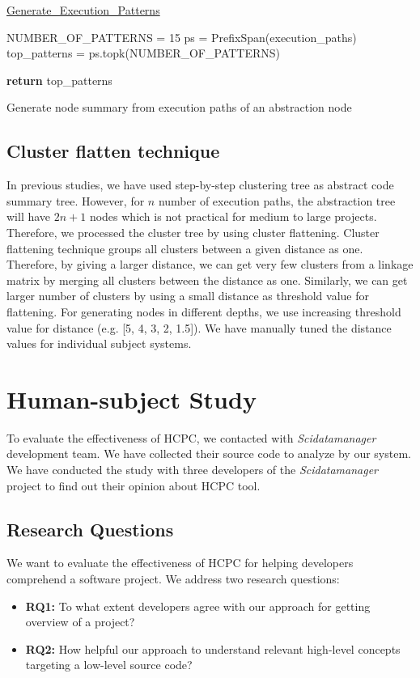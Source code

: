 \begin{algorithm}
    
    \underline{Generate\_Execution\_Patterns} 
    
    NUMBER\_OF\_PATTERNS = 15\;
    ps = PrefixSpan(execution\_paths)\;
    top\_patterns = ps.topk(NUMBER\_OF\_PATTERNS)\; 
    
    \textbf{return} top\_patterns\;
    \caption{Generate node summary from execution paths of an abstraction node}
    \label{alg:execution_patterns}
\end{algorithm}


\subsection{Cluster flatten technique}

In previous studies, we have used step-by-step clustering tree as abstract code summary tree. However, for $n$ number of execution paths, the abstraction tree will have $2n + 1$ nodes which is not practical for medium to large projects. Therefore, we processed the cluster tree by using cluster flattening. Cluster flattening technique groups all clusters between a given distance as one. Therefore, by giving a larger distance, we can get very few clusters from a linkage matrix by merging all clusters between the distance as one. Similarly, we can get larger number of clusters by using a small distance as threshold value for flattening. For generating nodes in different depths, we use increasing threshold value for distance (e.g. [5, 4, 3, 2, 1.5]). We have manually tuned the distance values for individual subject systems.


\section{Human-subject Study}
\label{hla3:human_study}
To evaluate the effectiveness of HCPC, we contacted with \emph{Scidatamanager} development team. We have collected their source code to analyze by our system. We have conducted the study with three developers of the \emph{Scidatamanager} project to find out their opinion about HCPC tool.

\subsection{Research Questions}
\label{hla3:evaluation}
We want to evaluate the effectiveness of HCPC for helping developers comprehend a software project. We address two research questions:
\begin{itemize}
    \item \textbf{RQ1:} To what extent developers agree with our approach for getting overview of a project?
    \item \textbf{RQ2:} How helpful our approach to understand relevant high-level concepts targeting a low-level source code?
\end{itemize}
